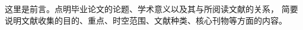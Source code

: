 \begin{foreword}
这里是前言。点明毕业论文的论题、学术意义以及其与所阅读文献的关系，
简要说明文献收集的目的、重点、时空范围、文献种类、核心刊物等方面的内容。
\end{foreword}

